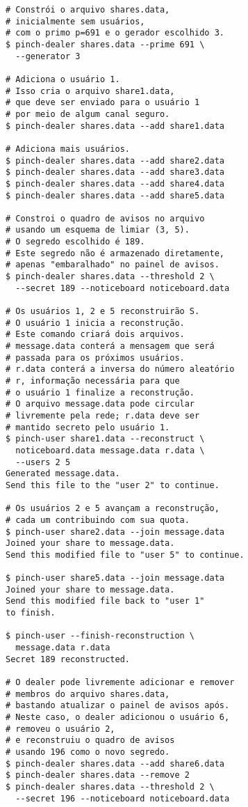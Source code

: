 \documentclass[10pt,twocolumn]{article}
\theoremstyle{definition}
\begin{document}
\begin{verbatim}
# Constrói o arquivo shares.data,
# inicialmente sem usuários,
# com o primo p=691 e o gerador escolhido 3.
$ pinch-dealer shares.data --prime 691 \
  --generator 3

# Adiciona o usuário 1.
# Isso cria o arquivo share1.data,
# que deve ser enviado para o usuário 1
# por meio de algum canal seguro.
$ pinch-dealer shares.data --add share1.data

# Adiciona mais usuários.
$ pinch-dealer shares.data --add share2.data
$ pinch-dealer shares.data --add share3.data
$ pinch-dealer shares.data --add share4.data
$ pinch-dealer shares.data --add share5.data

# Constroi o quadro de avisos no arquivo
# usando um esquema de limiar (3, 5).
# O segredo escolhido é 189.
# Este segredo não é armazenado diretamente,
# apenas "embaralhado" no painel de avisos.
$ pinch-dealer shares.data --threshold 2 \
  --secret 189 --noticeboard noticeboard.data

# Os usuários 1, 2 e 5 reconstruirão S.
# O usuário 1 inicia a reconstrução.
# Este comando criará dois arquivos.
# message.data conterá a mensagem que será
# passada para os próximos usuários.
# r.data conterá a inversa do número aleatório
# r, informação necessária para que
# o usuário 1 finalize a reconstrução.
# O arquivo message.data pode circular
# livremente pela rede; r.data deve ser
# mantido secreto pelo usuário 1.
$ pinch-user share1.data --reconstruct \
  noticeboard.data message.data r.data \
  --users 2 5
Generated message.data.
Send this file to the "user 2" to continue.

# Os usuários 2 e 5 avançam a reconstrução,
# cada um contribuindo com sua quota.
$ pinch-user share2.data --join message.data
Joined your share to message.data.
Send this modified file to "user 5" to continue.

$ pinch-user share5.data --join message.data
Joined your share to message.data.
Send this modified file back to "user 1"
to finish.

$ pinch-user --finish-reconstruction \
  message.data r.data
Secret 189 reconstructed.

# O dealer pode livremente adicionar e remover
# membros do arquivo shares.data,
# bastando atualizar o painel de avisos após.
# Neste caso, o dealer adicionou o usuário 6,
# removeu o usuário 2,
# e reconstruiu o quadro de avisos
# usando 196 como o novo segredo.
$ pinch-dealer shares.data --add share6.data
$ pinch-dealer shares.data --remove 2
$ pinch-dealer shares.data --threshold 2 \
  --secret 196 --noticeboard noticeboard.data
\end{verbatim}



\end{document}
